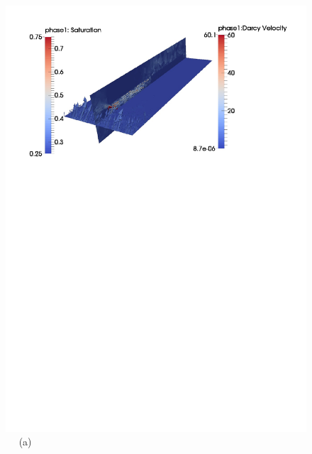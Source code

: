\begin{figure}[ht] 
\vbox{
\hbox{\hspace{0.5cm}
\includegraphics[width=1.0\textwidth]{./Pics1/3D_Channel/3D_channel_darcy_vel_planes_490_1_1.pdf} 
}
\vspace{-12.0cm}
\hbox{\hspace{6.0cm} (a)     
}
\hbox{\hspace{0.5cm}
}}
\end{figure}
